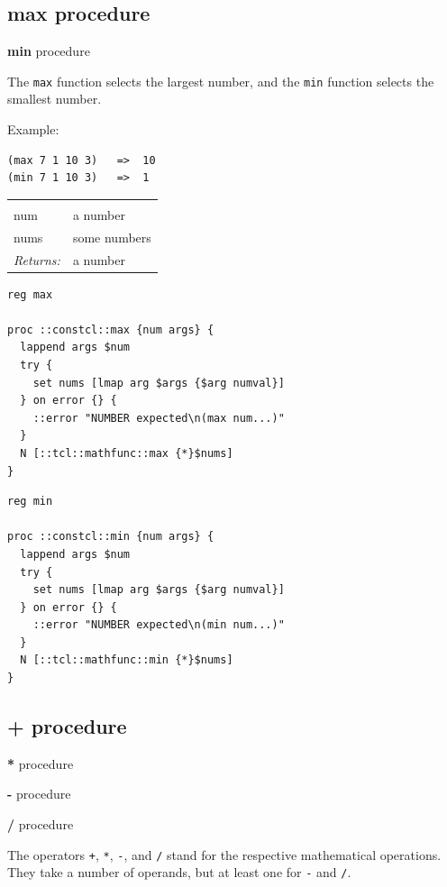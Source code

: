 \documentclass[twoside,9pt]{report}
\begin{document}
\subsection{max procedure}
\label{max-procedure}


\textbf{min} procedure


The \texttt{max} function selects the largest number, and the \texttt{min} function selects the smallest number.


Example:

\begin{verbatim}
(max 7 1 10 3)   =>  10
(min 7 1 10 3)   =>  1
\end{verbatim}
\noindent\begin{tabular}{ |p{1.9cm} p{8cm}| }
\hline
\rowcolor[HTML]{CCCCCC} \multicolumn{2}{|l|}{\bf max, min (public)} \\
num & a number \\
nums & some numbers \\
\textit{Returns:} & a number \\
\hline
\end{tabular}
\begin{lstlisting}
reg max

proc ::constcl::max {num args} {
  lappend args $num
  try {
    set nums [lmap arg $args {$arg numval}]
  } on error {} {
    ::error "NUMBER expected\n(max num...)"
  }
  N [::tcl::mathfunc::max {*}$nums]
}
\end{lstlisting}
\begin{lstlisting}
reg min

proc ::constcl::min {num args} {
  lappend args $num
  try {
    set nums [lmap arg $args {$arg numval}]
  } on error {} {
    ::error "NUMBER expected\n(min num...)"
  }
  N [::tcl::mathfunc::min {*}$nums]
}
\end{lstlisting}
\subsection{+ procedure}
\label{+-procedure}

\noindent \textbf{*} procedure


\noindent \textbf{-} procedure


\noindent \textbf{/} procedure



The operators \texttt{+}, \texttt{*}, \texttt{-}, and \texttt{/} stand for the respective mathematical operations. They take a number of operands, but at least one for \texttt{-} and \texttt{/}.
\end{document}

